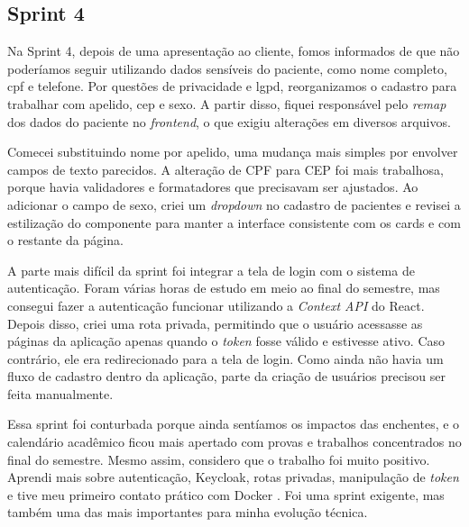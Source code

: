 \subsection{Sprint 4}

Na Sprint 4, depois de uma apresentação ao cliente, fomos informados de que não poderíamos seguir utilizando dados sensíveis do paciente, como nome completo, \ac{cpf} e telefone. Por questões de privacidade e \ac{lgpd}, reorganizamos o cadastro para trabalhar com apelido, \ac{cep} e sexo. A partir disso, fiquei responsável pelo \textit{remap} dos dados do paciente no \textit{frontend}, o que exigiu alterações em diversos arquivos.

Comecei substituindo nome por apelido, uma mudança mais simples por envolver campos de texto parecidos. A alteração de CPF para CEP foi mais trabalhosa, porque havia validadores e formatadores que precisavam ser ajustados. Ao adicionar o campo de sexo, criei um \textit{dropdown} no cadastro de pacientes e revisei a estilização do componente para manter a interface consistente com os cards e com o restante da página.

A parte mais difícil da sprint foi integrar a tela de login com o sistema de autenticação. Foram várias horas de estudo em meio ao final do semestre, mas consegui fazer a autenticação funcionar utilizando a \textit{Context API} do React. Depois disso, criei uma rota privada, permitindo que o usuário acessasse as páginas da aplicação apenas quando o \textit{token} fosse válido e estivesse ativo. Caso contrário, ele era redirecionado para a tela de login. Como ainda não havia um fluxo de cadastro dentro da aplicação, parte da criação de usuários precisou ser feita manualmente.

Essa sprint foi conturbada porque ainda sentíamos os impactos das enchentes, e o calendário acadêmico ficou mais apertado com provas e trabalhos concentrados no final do semestre. Mesmo assim, considero que o trabalho foi muito positivo. Aprendi mais sobre autenticação, Keycloak, rotas privadas, manipulação de \textit{token} e tive meu primeiro contato prático com Docker \cite{docker}. Foi uma sprint exigente, mas também uma das mais importantes para minha evolução técnica.
